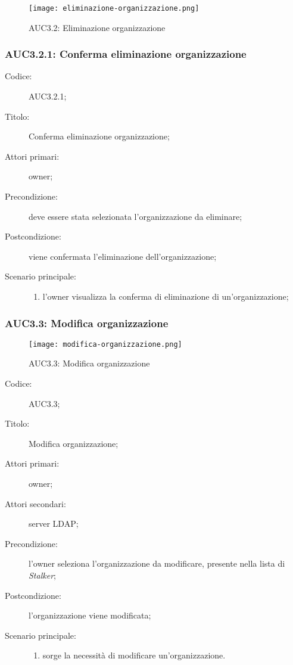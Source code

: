 \documentclass[../../../analisi-dei-requisiti.tex]{subfiles}
\begin{document}
\begin{figure}[H]
  \centering
  \texttt{[image: eliminazione-organizzazione.png]}
  \caption{AUC3.2: Eliminazione organizzazione}%
  \label{fig:AUC3.2}
\end{figure}

\subsubsection{AUC3.2.1: Conferma eliminazione organizzazione}%
\label{subs:AUC3.2.1}
\begin{description}
  \item[Codice:] AUC3.2.1;
  \item[Titolo:] Conferma eliminazione organizzazione;
  \item[Attori primari:] owner;
  \item[Precondizione:] deve essere stata selezionata l'organizzazione da eliminare;
  \item[Postcondizione:] viene confermata l'eliminazione dell'organizzazione;
  \item[Scenario principale:]
        \begin{enumerate}
          \item l'owner visualizza la conferma di eliminazione di un'organizzazione;
        \end{enumerate}
\end{description}

\subsubsection{AUC3.3: Modifica organizzazione}%
\label{subs:AUC3.3}

\begin{figure}[H]
  \centering
  \texttt{[image: modifica-organizzazione.png]}
  \caption{AUC3.3: Modifica organizzazione}%
  \label{fig:AUC3_3}
\end{figure}

\begin{description}
  \item[Codice:] AUC3.3;
  \item[Titolo:] Modifica organizzazione;
  \item[Attori primari:] owner;
  \item[Attori secondari:] server LDAP\@;
  \item[Precondizione:] l'owner seleziona l'organizzazione da modificare, presente nella lista di \emph{Stalker};
  \item[Postcondizione:] l'organizzazione viene modificata;
  \item[Scenario principale:]
        \begin{enumerate}
          \item sorge la necessità di modificare un'organizzazione.
        \end{enumerate}
\end{description}
\end{document}
